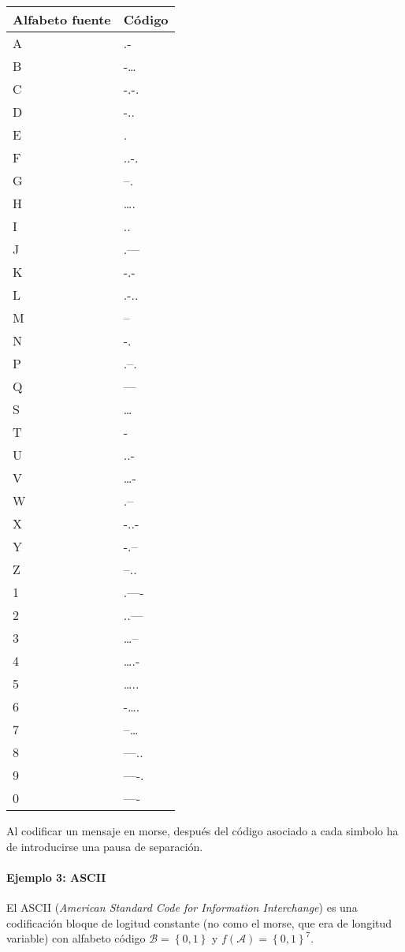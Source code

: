 \begin{longtable}[]{@{}ll@{}}
\toprule\noalign{}
Alfabeto fuente & Código \\
\midrule\noalign{}
\endhead
\bottomrule\noalign{}
\endlastfoot
A & .- \\
B & -\ldots{} \\
C & -.-. \\
D & -.. \\
E & . \\
F & ..-. \\
G & --. \\
H & \ldots. \\
I & .. \\
J & .--- \\
K & -.- \\
L & .-.. \\
M & -- \\
N & -. \\
P & .--. \\
Q & --- \\
S & \ldots{} \\
T & - \\
U & ..- \\
V & \ldots- \\
W & .-- \\
X & -..- \\
Y & -.-- \\
Z & --.. \\
1 & .---- \\
2 & ..--- \\
3 & \ldots-- \\
4 & \ldots.- \\
5 & \ldots.. \\
6 & -\ldots. \\
7 & --\ldots{} \\
8 & ---.. \\
9 & ----. \\
0 & ---- \\
\end{longtable}

Al codificar un mensaje en morse, después del código asociado a cada
simbolo ha de introducirse una pausa de separación.

\paragraph{Ejemplo 3: ASCII}\label{ejemplo-3-ascii}

El ASCII (\emph{American Standard Code for Information Interchange}) es
una codificación bloque de logitud constante (no como el morse, que era
de longitud variable) con alfabeto código
\(\mathcal{B}=\left\{0,1\right\}\) y
\(f(\mathcal{A})=\left\{0,1\right\}^7\).


